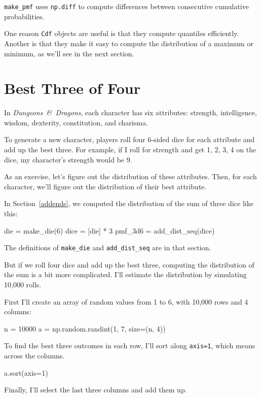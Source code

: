 \documentclass[12pt]{book}
\theoremstyle{exercise}
\newcommand{\py}[1]{{\tt #1}}%
\begin{document}
\py{make_pmf} uses \py{np.diff} to compute differences between consecutive cumulative probabilities.

One reason \py{Cdf} objects are useful is that they compute quantiles efficiently.
Another is that they make it easy to compute the distribution of a maximum or minimum, as we'll see in the next section.


\section{Best Three of Four}

In {\it Dungeons~\&~Dragons}, each character has six attributes: strength, intelligence, wisdom, dexterity, constitution, and charisma.

To generate a new character, players roll four 6-sided dice for each attribute and add up the best three.
For example, if I roll for strength and get 1, 2, 3, 4 on the dice, my character's strength would be 9.

As an exercise, let's figure out the distribution of these attributes.
Then, for each character, we'll figure out the distribution of their best attribute.

In Section~\ref{addends}, we computed the distribution of the sum of three dice like this:

\begin{code}
die = make_die(6)
dice = [die] * 3
pmf_3d6 = add_dist_seq(dice)
\end{code}

The definitions of \py{make_die} and \py{add_dist_seq} are in that section.

But if we roll four dice and add up the best three, computing the distribution of the sum is a bit more complicated.
I'll estimate the distribution by simulating 10,000 rolls.

First I'll create an array of random values from 1 to 6, with 10,000 rows and 4 columns:

\begin{code}
n = 10000
a = np.random.randint(1, 7, size=(n, 4))
\end{code}

To find the best three outcomes in each row, I'll sort along \py{axis=1}, which means across the columns.

\begin{code}
a.sort(axis=1)
\end{code}

Finally, I'll select the last three columns and add them up.
\end{document}
